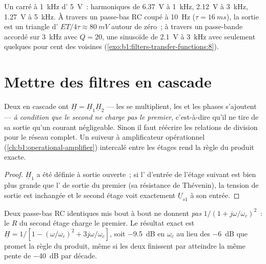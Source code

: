 \begin{example}\label{ex:b1:filters-transfer-functions:numbers}
Un  carré à \qty{1}{kHz} d' \qty{5}{V}~: harmoniques de
\qty{6.37}{V} à \qty{1}{kHz}, \qty{2.12}{V} à \qty{3}{kHz},
\qty{1.27}{V} à \qty{5}{kHz}. À travers un passe-bas RC coupé à
\qty{10}{Hz} ($\tau = \qty{16}{ms}$), la sortie est un triangle
d' $ET/4\tau \approx \qty{80}{mV}$ autour de zéro~; à travers
un passe-bande accordé sur \qty{3}{kHz} avec $Q = 20$, une sinusoïde de
\qty{2.1}{V} à \qty{3}{kHz} avec seulement quelques pour cent des
voisines (\cref{exo:b1:filters-transfer-functions:8}).
\end{example}

\section{Mettre des filtres en cascade}

\begin{proposition}\label{prop:b1:filters-transfer-functions:cascade}
Deux  en cascade ont $\underline H = \underline H_1\underline H_2$
--- les  se multiplient, les  et les phases s'ajoutent ---
\emph{à condition que le second ne charge pas le premier}, c'est-à-dire
qu'il ne tire de sa sortie qu'un courant négligeable. Sinon il faut
réécrire les relations de division pour le réseau complet. Un suiveur à
amplificateur opérationnel
(\cref{ch:b1:operational-amplifier}) intercalé entre les étages rend la
règle du produit exacte.
\end{proposition}

\begin{proof}
$\underline H_1$ a été définie à sortie ouverte~; si l'
d'entrée de l'étage suivant est bien plus grande que l' de
sortie du premier (sa résistance de Thévenin), la tension de sortie est
inchangée et le second étage voit exactement $\underline U_{s1}$ à son
entrée.
\end{proof}

\begin{example}\label{ex:b1:filters-transfer-functions:tworc}
Deux passe-bas RC identiques mis bout à bout ne donnent \emph{pas}
$1/(1 + j\omega/\omega_c)^2$~: le $R$ du second étage charge le premier.
Le résultat exact est $\underline H = 1/[1 - (\omega/\omega_c)^2 +
3j\omega/\omega_c]$, soit \qty{-9.5}{dB} en $\omega_c$ au lieu des
\qty{-6}{dB} que promet la règle du produit, même si les deux finissent
par atteindre la même pente de \qty{-40}{dB} par décade.
\end{example}

